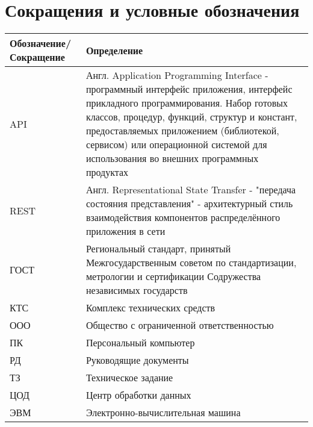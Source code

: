 \chapter*{Сокращения и условные обозначения}

\begin{table}[ht]
	\begin{tabular}{|p{5cm}|p{10cm}|}
		\hline
		Обозначение/Сокращение & Определение \\ \hline
		API	& Англ. Application Programming Interface - программный интерфейс приложения, интерфейс прикладного программирования. Набор готовых классов, процедур, функций, структур и констант, предоставляемых приложением (библиотекой, сервисом) или операционной системой для использования во внешних программных продуктах
\\ \hline
		REST	& Англ. Representational State Transfer - "передача состояния представления" - архитектурный стиль взаимодействия компонентов распределённого приложения в сети
\\ \hline
		ГОСТ	& Региональный стандарт, принятый Межгосударственным советом по стандартизации, метрологии и сертификации Содружества независимых государств
\\ \hline
		КТС	& Комплекс технических средств
 \\ \hline
		ООО	& Общество с ограниченной ответственностью
\\ \hline
		ПК	& Персональный компьютер
\\ \hline
		РД	& Руководящие документы
\\ \hline
		ТЗ	& Техническое задание
\\ \hline
		ЦОД	& Центр обработки данных
\\ \hline
		ЭВМ	& Электронно-вычислительная машина
\\ \hline
		
	\end{tabular}

	
\end{table}